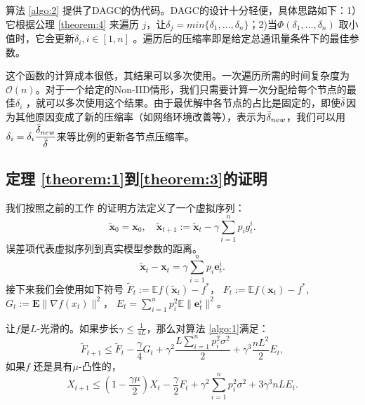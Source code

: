 算法 \ref{algo:2} 提供了DAGC的伪代码。DAGC的设计十分轻便，具体思路如下：1）它根据公理 \ref{theorem:4} 来遍历 $j$，让$\delta_j=min\{\delta_1,\ldots,\delta_n\}$；2)当$\Phi(\delta_1,\ldots,\delta_n)$  取小值时，它会更新$\delta_i, i\in[1,n]$ 。遍历后的压缩率即是给定总通讯量条件下的最佳参数。


这个函数的计算成本很低，其结果可以多次使用。一次遍历所需的时间复杂度为$\mathcal{O}(n)$。对于一个给定的Non-IID情形，我们只需要计算一次分配给每个节点的最佳$\delta_i$ ，就可以多次使用这个结果。由于最优解中各节点的占比是固定的，即使$\Bar{\delta}$因为其他原因变成了新的压缩率（如网络环境改善等），表示为$\Bar{\delta}_{new}$，我们可以用$\delta_i=\delta_i\dfrac{\Bar{\delta}_{new}}{\Bar{\delta}}$来等比例的更新各节点压缩率。

\subsection{定理 \ref{theorem:1}到\ref{theorem:3}的证明}
我们按照之前的工作 \cite{stich2019error}的证明方法定义了一个虚拟序列：
\begin{equation}
\tilde{\textbf{x}}_0 = \textbf{x}_0, \quad \tilde{\textbf{x}}_{t+1} := \tilde{\textbf{x}}_{t}-\gamma\sum_{i=1}^n p_i g_t^i \nonumber.
\end{equation}
误差项代表虚拟序列到真实模型参数的距离。
\begin{equation}
 \tilde{\textbf{x}}_{t} - \textbf{x}_{t} = \gamma \sum_{i=1}^n p_i \textbf{e}_t^i \nonumber.
\end{equation}
接下来我们会使用如下符号 $\tilde{F}_t:=\mathbb{E} f(\tilde{\textbf{x}}_t) - f^* $， $F_t:=\mathbb{E} f(\textbf{x}_t) - f^* $, $G_t:=\textbf{E}\lVert \nabla f(x_t)\rVert^2$， $E_t=\sum_{i=1}^n p_i^2 \mathbb{E}\lVert \textbf{e}_t^i \rVert^2$。
\begin{lemma}
让$f$是$L$-光滑的。如果步长$\gamma \leq \frac{1}{4L}$，那么对算法 \ref{algo:1}满足：
\begin{equation}
\label{lemma:1a}
    \tilde{F}_{t+1}\leq \tilde{F}_t - \frac{\gamma}{4}G_t + \gamma^2 \frac{L \sum_{i=1}^n p_i^2\sigma^2}{2} + \gamma^3 \frac{n L^2}{2} E_t,
\end{equation}
如果$f$ 还是具有$\mu$-凸性的，
\begin{equation}
\label{lemma:1b}
    X_{t+1}\leq (1-\frac{\gamma \mu}{2})X_t - \frac{\gamma}{2}F_t + \gamma^2 \sum_{i=1}^n p_i^2\sigma^2 + 3 \gamma^3 n L E_t.
\end{equation}
\end{lemma}

